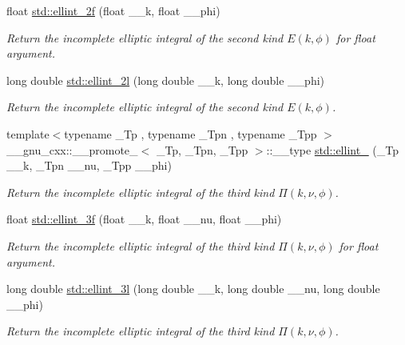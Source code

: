 \begin{DoxyCompactItemize}
float \hyperlink{group__tr29124__math__spec__func_ga594a730163c6228c75b152462700062b}{std\+::ellint\+\_\+2f} (float \+\_\+\+\_\+k, float \+\_\+\+\_\+phi)
\begin{DoxyCompactList}\small\item\em Return the incomplete elliptic integral of the second kind $ E(k,\phi) $ for {\ttfamily float} argument. \end{DoxyCompactList}\item 
long double \hyperlink{group__tr29124__math__spec__func_ga5c791332d374a809d8ca16c69a1a30f5}{std\+::ellint\+\_\+2l} (long double \+\_\+\+\_\+k, long double \+\_\+\+\_\+phi)
\begin{DoxyCompactList}\small\item\em Return the incomplete elliptic integral of the second kind $ E(k,\phi) $. \end{DoxyCompactList}\item 
{\footnotesize template$<$typename \+\_\+\+Tp , typename \+\_\+\+Tpn , typename \+\_\+\+Tpp $>$ }\\\+\_\+\+\_\+gnu\+\_\+cxx\+::\+\_\+\+\_\+promote\+\_$<$ \+\_\+\+Tp, \+\_\+\+Tpn, \+\_\+\+Tpp $>$\+::\+\_\+\+\_\+type \hyperlink{group__tr29124__math__spec__func_ga20832e3a67d25cc3d415cafc88019ac3}{std\+::ellint\+\_} (\+\_\+\+Tp \+\_\+\+\_\+k, \+\_\+\+Tpn \+\_\+\+\_\+nu, \+\_\+\+Tpp \+\_\+\+\_\+phi)
\begin{DoxyCompactList}\small\item\em Return the incomplete elliptic integral of the third kind $ \Pi(k,\nu,\phi) $. \end{DoxyCompactList}\item 
float \hyperlink{group__tr29124__math__spec__func_ga1a80bd2c15bc9fbecda2630a9e9409e7}{std\+::ellint\+\_\+3f} (float \+\_\+\+\_\+k, float \+\_\+\+\_\+nu, float \+\_\+\+\_\+phi)
\begin{DoxyCompactList}\small\item\em Return the incomplete elliptic integral of the third kind $ \Pi(k,\nu,\phi) $ for {\ttfamily float} argument. \end{DoxyCompactList}\item 
long double \hyperlink{group__tr29124__math__spec__func_gaa8c0e5864df8769021a7f3e21a30c5d2}{std\+::ellint\+\_\+3l} (long double \+\_\+\+\_\+k, long double \+\_\+\+\_\+nu, long double \+\_\+\+\_\+phi)
\begin{DoxyCompactList}\small\item\em Return the incomplete elliptic integral of the third kind $ \Pi(k,\nu,\phi) $. \end{DoxyCompactList}\item 

\end{DoxyCompactItemize}
